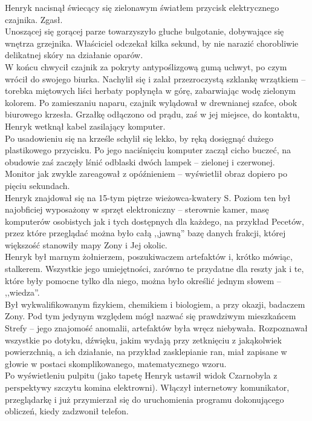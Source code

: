 \documentclass[../MAIN.tex]{subfiles}
\begin{document}
Henryk nacisnął świecący się zielonawym światłem przycisk elektrycznego czajnika. Zgasł.\\
Unoszącej się gorącej parze towarzyszyło głuche bulgotanie, dobywające się wnętrza grzejnika. Właściciel odczekał kilka sekund, by nie narazić chorobliwie delikatnej skóry na działanie oparów.\\
W końcu chwycił czajnik za pokryty antypoślizgową gumą uchwyt, po czym wrócił do swojego biurka. Nachylił się i zalał przezroczystą szklankę wrzątkiem -- torebka miętowych liści herbaty popłynęła w górę, zabarwiając wodę zielonym kolorem. Po zamieszaniu naparu, czajnik wylądował w drewnianej szafce, obok biurowego krzesła. Grzałkę odłączono od prądu, zaś w jej miejsce, do kontaktu, Henryk wetknął kabel zasilający komputer.\\
Po usadowieniu się na krześle schylił się lekko, by ręką dosięgnąć dużego plastikowego przycisku. Po jego naciśnięciu komputer zaczął cicho buczeć, na obudowie zaś zaczęły lśnić odblaski dwóch lampek -- zielonej i czerwonej.\\
Monitor jak zwykle zareagował z opóźnieniem -- wyświetlił obraz dopiero po pięciu sekundach.\\
Henryk znajdował się na 15-tym piętrze wieżowca-kwatery S. Poziom ten był najobficiej wyposażony w sprzęt elektroniczny -- sterownie kamer, masę komputerów osobistych jak i tych dostępnych dla każdego, na przykład Pecetów, przez które przeglądać można było całą ,,jawną'' bazę danych frakcji, której większość stanowiły mapy Zony i Jej okolic.\\
Henryk był marnym żołnierzem, poszukiwaczem artefaktów i, krótko mówiąc, stalkerem. Wszystkie jego umiejętności, zarówno te przydatne dla reszty jak i te, które były pomocne tylko dla niego, można było określić jednym słowem -- ,,wiedza''.\\
Był wykwalifikowanym fizykiem, chemikiem i biologiem, a przy okazji, badaczem Zony. Pod tym jedynym względem mógł nazwać się prawdziwym mieszkańcem Strefy -- jego znajomość anomalii, artefaktów była wręcz niebywała. Rozpoznawał wszystkie po dotyku, dźwięku, jakim wydają przy zetknięciu z jakąkolwiek powierzchnią, a ich działanie, na przykład zasklepianie ran, miał zapisane w głowie w postaci skomplikowanego, matematycznego wzoru.\\
Po wyświetleniu pulpitu (jako tapetę Henryk ustawił widok Czarnobyla z perspektywy szczytu komina elektrowni). Włączył internetowy komunikator, przeglądarkę i już przymierzał się do uruchomienia programu dokonującego obliczeń, kiedy zadzwonił telefon.\\
\end{document}

